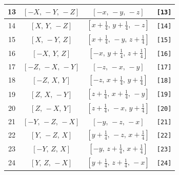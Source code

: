 \documentclass[fleqn,8pt]{jsarticle}
\begin{document}
\begin{longtable}{cccc}
13 & $\left[ - X,\, - Y,\, - Z \right]$ & $\left[ - x,\, - y,\, - z \right]$ & {\tt [13]} \\ \hline
14 & $\left[ X,\, Y,\, - Z \right]$ & $\left[ x + \frac{1}{4},\, y + \frac{1}{4},\, - z \right]$ & {\tt [14]} \\ \hline
15 & $\left[ X,\, - Y,\, Z \right]$ & $\left[ x + \frac{1}{4},\, - y,\, z + \frac{1}{4} \right]$ & {\tt [15]} \\ \hline
16 & $\left[ - X,\, Y,\, Z \right]$ & $\left[ - x,\, y + \frac{1}{4},\, z + \frac{1}{4} \right]$ & {\tt [16]} \\ \hline
17 & $\left[ - Z,\, - X,\, - Y \right]$ & $\left[ - z,\, - x,\, - y \right]$ & {\tt [17]} \\ \hline
18 & $\left[ - Z,\, X,\, Y \right]$ & $\left[ - z,\, x + \frac{1}{4},\, y + \frac{1}{4} \right]$ & {\tt [18]} \\ \hline
19 & $\left[ Z,\, X,\, - Y \right]$ & $\left[ z + \frac{1}{4},\, x + \frac{1}{4},\, - y \right]$ & {\tt [19]} \\ \hline
20 & $\left[ Z,\, - X,\, Y \right]$ & $\left[ z + \frac{1}{4},\, - x,\, y + \frac{1}{4} \right]$ & {\tt [20]} \\ \hline
21 & $\left[ - Y,\, - Z,\, - X \right]$ & $\left[ - y,\, - z,\, - x \right]$ & {\tt [21]} \\ \hline
22 & $\left[ Y,\, - Z,\, X \right]$ & $\left[ y + \frac{1}{4},\, - z,\, x + \frac{1}{4} \right]$ & {\tt [22]} \\ \hline
23 & $\left[ - Y,\, Z,\, X \right]$ & $\left[ - y,\, z + \frac{1}{4},\, x + \frac{1}{4} \right]$ & {\tt [23]} \\ \hline
24 & $\left[ Y,\, Z,\, - X \right]$ & $\left[ y + \frac{1}{4},\, z + \frac{1}{4},\, - x \right]$ & {\tt [24]} \\
\end{longtable}
\end{document}
